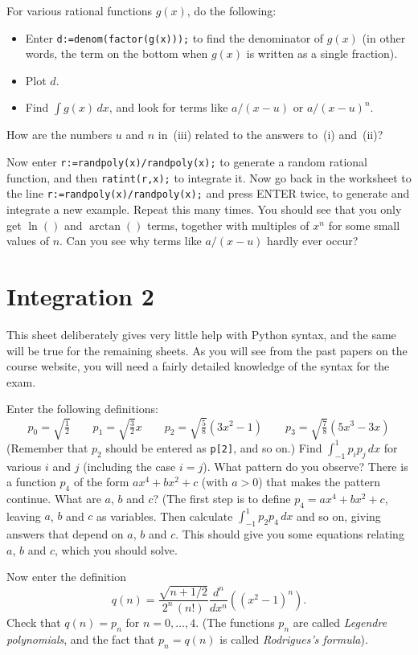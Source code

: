 \documentclass[a4paper,10pt]{amsbook}
\begin{document}
\begin{exercise}
 For various rational functions $g(x)$, do the following:
 \begin{itemize}
  \item[(i)] Enter \verb~d:=denom(factor(g(x)));~ to find
   the denominator of $g(x)$ (in other words, the term on
   the bottom when $g(x)$ is written as a single fraction).
  \item[(ii)] Plot $d$.
  \item[(iii)] Find $\int g(x)\,dx$, and look for terms like
   $a/(x-u)$ or $a/(x-u)^n$. 
 \end{itemize}
 How are the numbers $u$ and $n$ in~(iii) related to the
 answers to~(i) and~(ii)?
 
 Now enter \verb~r:=randpoly(x)/randpoly(x);~ to generate a
 random rational function, and then \verb~ratint(r,x);~ to
 integrate it.  Now go back in the worksheet to the line
 \verb~r:=randpoly(x)/randpoly(x);~ and press ENTER twice,
 to generate and integrate a new example.  Repeat this many
 times.  You should see that you only get $\ln()$ and
 $\arctan()$ terms, together with multiples of $x^n$ for
 some small values of $n$.  Can you see why terms like
 $a/(x-u)$ hardly ever occur?
\end{exercise}


\chapter{Integration 2}

This sheet deliberately gives very little help with Python syntax, and
the same will be true for the remaining sheets.  As you will see from
the past papers on the course website, you will need a fairly detailed
knowledge of the syntax for the exam.

\begin{exercise}\label{ex-legendre}
 Enter the following definitions:
 \[
  p_0 = \sqrt{\tfrac{1}{2}}            \hspace{2em}
  p_1 = \sqrt{\tfrac{3}{2}} x          \hspace{2em}
  p_2 = \sqrt{\tfrac{5}{8}}(3x^2 - 1)  \hspace{2em}
  p_3 = \sqrt{\tfrac{7}{8}}(5x^3 - 3x)
 \]
 (Remember that $p_2$ should be entered as
 \verb~p[2]~, and so on.)  Find
 $\int_{-1}^1p_ip_j\,dx$ for various $i$ and $j$
 (including the case $i=j$).  What pattern do you observe?
 There is a function $p_4$ of the form $ax^4+bx^2+c$
 (with $a>0$) that makes the pattern continue.  What are
 $a$, $b$ and $c$?  (The first step is to define
 $p_4=ax^4+bx^2+c$, leaving $a$, $b$ and $c$ as
 variables.  Then calculate $\int_{-1}^1p_2p_4\, dx$
 and so on, giving answers that depend on $a$, $b$ and $c$.
 This should give you some equations relating $a$, $b$ and
 $c$, which you should solve.  

 Now enter the definition
 \[ q(n) =
     \frac{\sqrt{n+1/2}}{2^n\,(n!)}
      \frac{d^n}{dx^n}\left((x^2-1)^n\right).
 \]
 Check that $q(n)=p_n$ for $n=0,\ldots,4$. (The functions $p_n$ are
 called \emph{Legendre polynomials}, and the fact that $p_n=q(n)$ is
 called \emph{Rodrigues's formula}).
\end{exercise}
\end{document}
